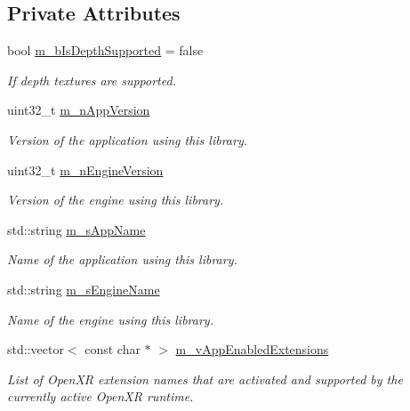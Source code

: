 \subsection*{Private Attributes}
\begin{DoxyCompactItemize}
\item 
bool \mbox{\hyperlink{class_open_x_r_provider_1_1_x_r_provider_ab5e48dc08aa6d7e3656ee9da55bcc076}{m\+\_\+b\+Is\+Depth\+Supported}} = false
\begin{DoxyCompactList}\small\item\em If depth textures are supported. \end{DoxyCompactList}\item 
uint32\+\_\+t \mbox{\hyperlink{class_open_x_r_provider_1_1_x_r_provider_aeede3bd8748b648cf9fd0d8527211047}{m\+\_\+n\+App\+Version}}
\begin{DoxyCompactList}\small\item\em Version of the application using this library. \end{DoxyCompactList}\item 
uint32\+\_\+t \mbox{\hyperlink{class_open_x_r_provider_1_1_x_r_provider_ae8ff1303046ba5c0f6e0d1e5e466198e}{m\+\_\+n\+Engine\+Version}}
\begin{DoxyCompactList}\small\item\em Version of the engine using this library. \end{DoxyCompactList}\item 
std\+::string \mbox{\hyperlink{class_open_x_r_provider_1_1_x_r_provider_a3683ac6e2def851431522ea4ba3cf784}{m\+\_\+s\+App\+Name}}
\begin{DoxyCompactList}\small\item\em Name of the application using this library. \end{DoxyCompactList}\item 
std\+::string \mbox{\hyperlink{class_open_x_r_provider_1_1_x_r_provider_afaa7e0d87fcb7349324328b07a96f8e8}{m\+\_\+s\+Engine\+Name}}
\begin{DoxyCompactList}\small\item\em Name of the engine using this library. \end{DoxyCompactList}\item 
std\+::vector$<$ const char $\ast$ $>$ \mbox{\hyperlink{class_open_x_r_provider_1_1_x_r_provider_a4d49ff8b8fbf41abcddadb833dc07008}{m\+\_\+v\+App\+Enabled\+Extensions}}
\begin{DoxyCompactList}\small\item\em List of Open\+XR extension names that are activated and supported by the currently active Open\+XR runtime. \end{DoxyCompactList}\item 

\end{DoxyCompactItemize}
